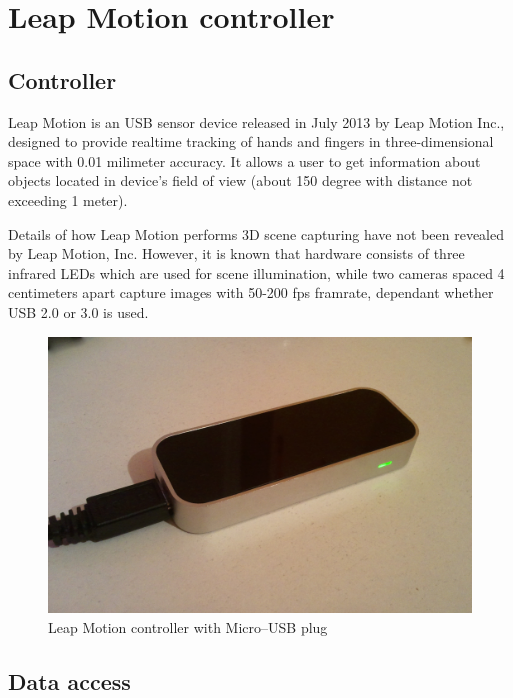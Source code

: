 \chapter{Leap Motion controller}\label{LMCChapter}

\section{Controller}
Leap Motion is an USB sensor device released in July 2013 by Leap Motion Inc., designed to provide realtime tracking of hands and fingers in three-dimensional space with 0.01 milimeter accuracy. It allows a user to get information about objects located in device's field of view (about 150 degree with distance not exceeding 1 meter).

Details of how Leap Motion performs 3D scene capturing have not been revealed by Leap Motion, Inc. However, it is known that hardware consists of three infrared LEDs which are used for scene illumination, while two cameras spaced 4 centimeters apart capture images with 50-200 fps framrate, dependant whether USB 2.0 or 3.0 is used.

\begin{figure}[htb]
\centering
 \includegraphics[width=1\columnwidth]{figures/leapmotion.jpg}
 \caption{Leap Motion controller with Micro--USB plug}
 \label{recorder}
\end{figure}

\section{Data access}

